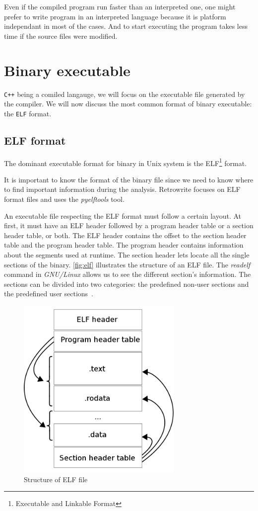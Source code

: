 \documentclass[a4paper,11pt,oneside]{report}
\newcommand{\sysname}{Retrowrite\xspace}
\begin{document}
Even if the compiled program run faster than an interpreted one, one might
prefer to write program in an interpreted language because it is platform
independant in most of the cases. And to start executing the program takes less
time if the source files were modified.



\section{Binary executable}
\texttt{C++} being a comiled langauge, we will focus on the executable file
generated by the compiler. We will now discuss the most common format of binary
executable: the \texttt{ELF} format.
\subsection{ELF format}
%
The dominant executable format for binary in Unix system is the
ELF\footnote{Executable and Linkable Format} format. 

It is important to know the format of the binary file since we need to know
where to find important information during the analysis. \sysname focuses on
ELF format files and uses the \textit{pyelftools} tool.


An executable file respecting the ELF format must follow a certain layout. At
first, it must have an ELF header followed by a program header table or a section
header table, or both. 
The ELF header contains the offset to the section header table and the program
header table. The program header contains information about the segments used
at runtime. The section header lets locate all the single sections of the
binary. \autoref{fig:elf} illustrates the structure of an ELF file. The
\textit{readelf}~\cite{readelfMan} command in \textit{GNU/Linux} allows us to
see the different section's information. The sections can be divided into two
categories: the predefined non-user sections and the predefined user
sections~\cite{sparc}.

\begin{figure}[H]
    \centering
    \includegraphics[width=8cm]{elf_structure.png} 
    \caption{Structure of ELF file}
    \label{fig:elf}
\end{figure}
\end{document}

